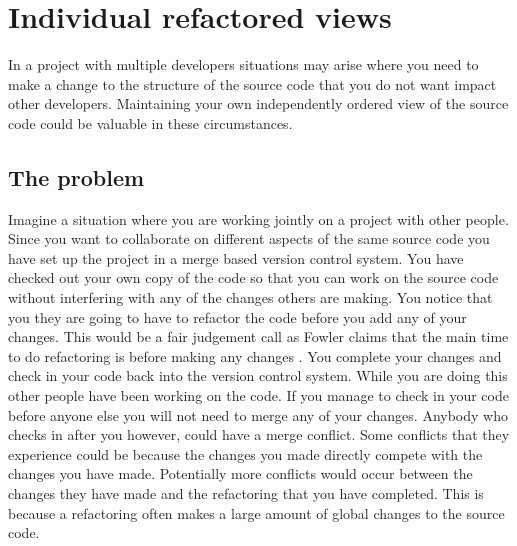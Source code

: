 
\chapter{Individual refactored views}

In a project with multiple developers situations may arise where you need to make a change to the structure of the source code that you do not want impact other developers.  Maintaining your own independently ordered view of the source code could be valuable in these circumstances. 

\section{The problem}


% 
% 

Imagine a situation where you are working jointly on a project with other people. Since you want to collaborate on different aspects of the same source code you have set up the project in a merge based version control system.  You have checked out your own copy of the code so that you can work on the source code without interfering with any of the changes others are making. You notice that you they are going to have to refactor the code before you add any of your changes.  This would be a fair judgement call as Fowler claims that the main time to do refactoring is before making any changes \cite{Fowler1999}. You complete your changes and check in your code back into the version control system.  While you are doing this other people have been working on the code.  If you manage to check in your code before anyone else you will not need to merge any of your changes.  Anybody who checks in after you however, could have a merge conflict.  Some conflicts that they experience could be because the changes you made directly compete with the changes you have made. Potentially more conflicts would occur between the changes they have made and the refactoring that you have completed. This is because a refactoring often makes a large amount of global changes to the source code.

